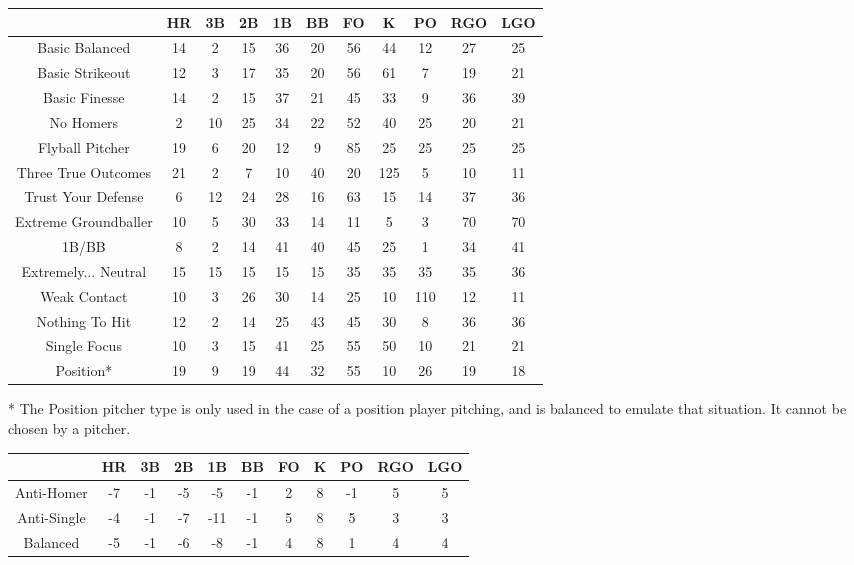 \begin{center}
    \begin{tabular}{|c|c|c|c|c|c|c|c|c|c|c|}
		\hline
        & HR & 3B & 2B & 1B & BB & FO & K   & PO & RGO & LGO    \\
        \hline
Basic Balanced & 14 & 2 & 15 & 36 & 20 & 56 & 44 & 12 & 27 & 25 \\
\hline
Basic Strikeout & 12 & 3 & 17 & 35 & 20 & 56 & 61 & 7 & 19 & 21 \\
\hline
Basic Finesse & 14 & 2 & 15 & 37 & 21 & 45 & 33 & 9 & 36 & 39 \\
\hline
No Homers & 2 & 10 & 25 & 34 & 22 & 52 & 40 & 25 & 20 & 21 \\
\hline
Flyball Pitcher & 19 & 6 & 20 & 12 & 9 & 85 & 25 & 25 & 25 & 25 \\
\hline
Three True Outcomes & 21 & 2 & 7 & 10 & 40 & 20 & 125 & 5 & 10 & 11 \\
\hline
Trust Your Defense & 6 & 12 & 24 & 28 & 16 & 63 & 15 & 14 & 37 & 36 \\
\hline
Extreme Groundballer & 10 & 5 & 30 & 33 & 14 & 11 & 5 & 3 & 70 & 70 \\
\hline
1B/BB & 8 & 2 & 14 & 41 & 40 & 45 & 25 & 1 & 34 & 41 \\
\hline
Extremely... Neutral & 15 & 15 & 15 & 15 & 15 & 35 & 35 & 35 & 35 & 36 \\
\hline
Weak Contact & 10 & 3 & 26 & 30 & 14 & 25 & 10 & 110 & 12 & 11 \\
\hline
Nothing To Hit & 12 & 2 & 14 & 25 & 43 & 45 & 30 & 8 & 36 & 36 \\
\hline
Single Focus & 10 & 3 & 15 & 41 & 25 & 55 & 50 & 10 & 21 & 21 \\
\hline
Position* & 19 & 9 & 19 & 44 & 32 & 55 & 10 & 26 & 19 & 18 \\
\hline
    \end{tabular}
\end{center}

* The Position pitcher type is only used in the case of a position player pitching, 
and is balanced to emulate that situation. 
It cannot be chosen by a pitcher.

\begin{center}
    \begin{tabular}{|c|c|c|c|c|c|c|c|c|c|c|}
		\hline
        & HR & 3B & 2B & 1B & BB & FO & K   & PO & RGO & LGO    \\
        \hline
        Anti-Homer & -7 & -1 & -5 & -5 & -1 & 2 & 8 & -1 & 5 & 5 \\
        \hline 
        Anti-Single & -4 & -1 & -7 & -11 & -1 & 5 & 8 & 5 & 3 & 3 \\
        \hline
        Balanced & -5 & -1 & -6 & -8 & -1 & 4 & 8 & 1 & 4 & 4 \\
        \hline
    \end{tabular}
\end{center}